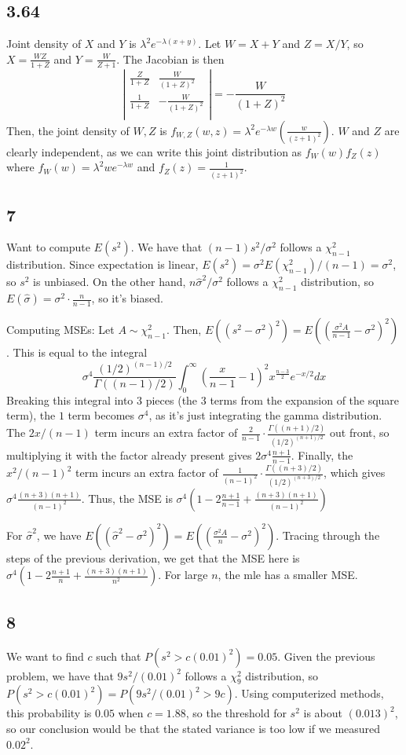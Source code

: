 \documentclass{article}
\begin{document}
\subsection*{3.64}
Joint density of $X$ and $Y$ is $\lambda^2e^{-\lambda(x+y)}$. Let $W=X+Y$ and $Z=X/Y$, so $X=\frac{WZ}{1+Z}$ and $Y=\frac{W}{Z+1}$. The Jacobian is then
$$\left|
\begin{array}{cc}
\frac{Z}{1+Z}&\frac{W}{(1+Z)^2}\\
\frac{1}{1+Z}&-\frac{W}{(1+Z)^2}\\
\end{array}\right|=-\frac{W}{(1+Z)^2}$$
Then, the joint density of $W,Z$ is $f_{W,Z}(w,z)=\lambda^2e^{-\lambda w}(\frac{w}{(z+1)^2})$. $W$ and $Z$ are clearly independent, as we can write this joint distribution as $f_W(w)f_Z(z)$ where $f_W(w)=\lambda^2 we^{-\lambda w}$ and $f_Z(z)=\frac{1}{(z+1)^2}$.
\subsection*{7}
Want to compute $E(s^2)$. We have that $(n-1)s^2/\sigma^2$ follows a $\chi^2_{n-1}$ distribution. Since expectation is linear, $E(s^2)=\sigma^2E(\chi^2_{n-1})/(n-1)=\sigma^2$, so $s^2$ is unbiased. On the other hand, $n\hat{\sigma}^2/\sigma^2$ follows a $\chi^2_{n-1}$ distribution, so $E(\hat{\sigma})=\sigma^2\cdot\frac{n}{n-1}$, so it's biased.

Computing MSEs: Let $A\sim\chi^2_{n-1}$. Then, $E((s^2-\sigma^2)^2)=E((\frac{\sigma^2 A}{n-1}-\sigma^2)^2)$. This is equal to the integral 
$$\sigma^4\frac{(1/2)^{(n-1)/2}}{\Gamma((n-1)/2)}\int_0^\infty\left(\frac{x}{n-1}-1\right)^2x^{\frac{n-3}{2}}e^{-x/2}dx$$
Breaking this integral into 3 pieces (the 3 terms from the expansion of the square term), the $1$ term becomes $\sigma^4$, as it's just integrating the gamma distribution. The $2x/(n-1)$ term incurs an extra factor of $\frac{2}{n-1}\cdot\frac{\Gamma((n+1)/2)}{(1/2)^{(n+1)/2}}$ out front, so multiplying it with the factor already present gives $2\sigma^4\frac{n+1}{n-1}$. Finally, the $x^2/(n-1)^2$ term incurs an extra factor of $\frac{1}{(n-1)^2}\cdot\frac{\Gamma((n+3)/2)}{(1/2)^{(n+3)/2}}$, which gives $\sigma^4\frac{(n+3)(n+1)}{(n-1)^2}$. Thus, the MSE is $\sigma^4\left(1-2\frac{n+1}{n-1}+\frac{(n+3)(n+1)}{(n-1)^2}\right)$

For $\hat{\sigma}^2$, we have $E((\hat{\sigma}^2-\sigma^2)^2)=E((\frac{\sigma^2 A}{n}-\sigma^2)^2)$. Tracing through the steps of the previous derivation, we get that the MSE here is $\sigma^4\left(1-2\frac{n+1}{n}+\frac{(n+3)(n+1)}{n^2}\right)$. For large $n$, the mle has a smaller MSE.
\subsection*{8}
We want to find $c$ such that $P(s^2>c(0.01)^2)=0.05$. Given the previous problem, we have that $9s^2/(0.01)^2$ follows a $\chi^2_{9}$ distribution, so $P(s^2>c(0.01)^2)=P(9s^2/(0.01)^2>9c)$. Using computerized methods, this probability is $0.05$ when $c=1.88$, so the threshold for $s^2$ is about $(0.013)^2$, so our conclusion would be that the stated variance is too low if we measured $0.02^2$.
\end{document}
